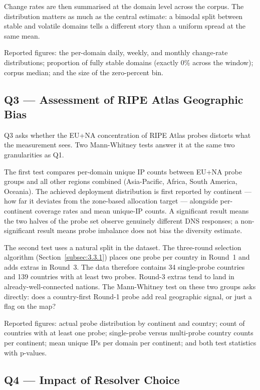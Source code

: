 Change rates are then summarised at the domain level across the corpus. The distribution matters as much as the central estimate: a bimodal split between stable and volatile domains tells a different story than a uniform spread at the same mean.

Reported figures: the per-domain daily, weekly, and monthly change-rate distributions; proportion of fully stable domains (exactly 0\% across the window); corpus median; and the size of the zero-percent bin.

\subsection{Q3 --- Assessment of RIPE Atlas Geographic Bias}
\label{subsec:3.5.3}

Q3 asks whether the EU+NA concentration of RIPE Atlas probes distorts what the measurement sees. Two Mann-Whitney tests answer it at the same two granularities as Q1.

The first test compares per-domain unique \ac{IP} counts between EU+NA probe groups and all other regions combined (Asia-Pacific, Africa, South America, Oceania). The achieved deployment distribution is first reported by continent --- how far it deviates from the zone-based allocation target --- alongside per-continent coverage rates and mean unique-\ac{IP} counts. A significant result means the two halves of the probe set observe genuinely different \ac{DNS} responses; a non-significant result means probe imbalance does not bias the diversity estimate.

The second test uses a natural split in the dataset. The three-round selection algorithm (Section~\ref{subsec:3.3.1}) places one probe per country in Round~1 and adds extras in Round~3. The data therefore contains 34 single-probe countries and 139 countries with at least two probes. Round-3 extras tend to land in already-well-connected nations. The Mann-Whitney test on these two groups asks directly: does a country-first Round-1 probe add real geographic signal, or just a flag on the map?

Reported figures: actual probe distribution by continent and country; count of countries with at least one probe; single-probe versus multi-probe country counts per continent; mean unique \ac{IP}s per domain per continent; and both test statistics with p-values.

\subsection{Q4 --- Impact of Resolver Choice}
\label{subsec:3.5.4}

